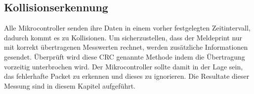 \subsection{Kollisionserkennung}
Alle Mikrocontroller senden ihre Daten in einem vorher festgelegten Zeitintervall, dadurch kommt es zu Kollisionen. Um sicherzustellen, dass der Meldeprint nur mit korrekt übertragenen Messwerten rechnet, werden zusätzliche Informationen gesendet. Überprüft wird diese CRC genannte Methode indem die Übertragung vorzeitig unterbrochen wird. Der Mikrocontroller sollte damit in der Lage sein, das fehlerhafte Packet zu erkennen und dieses zu ignorieren. Die Resultate dieser Messung sind in diesem Kapitel aufgeführt.